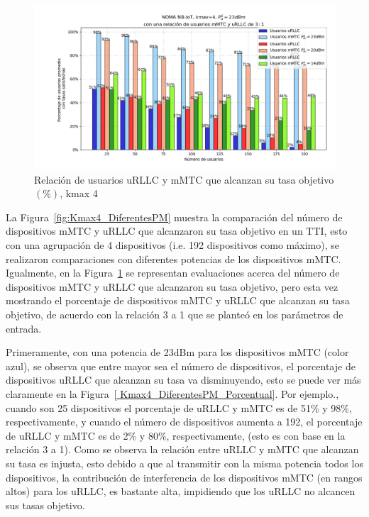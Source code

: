 \begin{figure}[th]
    \centering
    \includegraphics[scale=.65]{Figures/ResultadosNOMA/Kmax4_DiferentesPM_Porcentual.png}
    \decoRule
    \caption[Relación de usuarios uRLLC y mMTC que alcanzan su tasa objetivo $(\%)$, kmax 4]{Relación de usuarios uRLLC y mMTC que alcanzan su tasa objetivo$(\%)$, kmax 4}
    \label{fig:Kmax4_DiferentesPM_Porcentual}
\end{figure}


La Figura~\ref{fig:Kmax4_DiferentesPM} muestra la comparación del número de dispositivos mMTC y uRLLC que alcanzaron su tasa objetivo en un TTI, esto con una agrupación de 4 dispositivos (i.e. 192 dispositivos como máximo), se realizaron comparaciones con diferentes potencias de los dispositivos mMTC. Igualmente, en la Figura~\ref{fig:Kmax4_DiferentesPM_Porcentual} se representan evaluaciones acerca del número de dispositivos mMTC y uRLLC que alcanzaron su tasa objetivo, pero esta vez mostrando el porcentaje de dispositivos mMTC y uRLLC que alcanzan su tasa objetivo, de acuerdo con la relación 3 a 1 que se planteó en los parámetros de entrada.\newline

Primeramente, con una potencia de 23dBm para los dispositivos mMTC (color azul), se observa que entre mayor sea el número de dispositivos, el porcentaje de dispositivos uRLLC que alcanzan su tasa va disminuyendo, esto se puede ver más claramente en la Figura~\ref{ Kmax4_DiferentesPM_Porcentual}. Por ejemplo., cuando son 25 dispositivos el porcentaje de uRLLC y mMTC es de 51\% y 98\%, respectivamente, y cuando el número de dispositivos aumenta a 192, el porcentaje de uRLLC y mMTC es de 2\% y 80\%, respectivamente, (esto es con base en la relación 3 a 1). Como se observa la relación entre uRLLC y mMTC que alcanzan su tasa es injusta, esto debido a que al transmitir con la misma potencia todos los dispositivos, la contribución de interferencia de los dispositivos mMTC (en rangos altos) para los uRLLC, es bastante alta, impidiendo que los uRLLC no alcancen sus tasas objetivo.\newline

